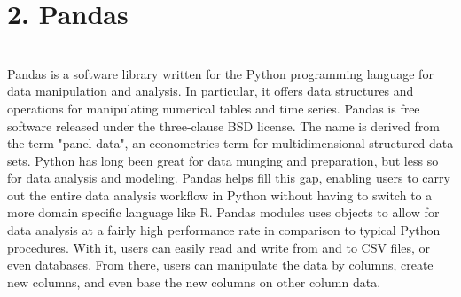 \chapter{\textbf{2. Pandas }}\\
Pandas is a software library written for the Python programming language for data manipulation and analysis. In particular, it offers data structures and operations for manipulating numerical tables and time series. Pandas is free software released under the three-clause BSD license. The name is derived from the term "panel data", an econometrics term for multidimensional structured data sets. Python has long been great for data munging and preparation, but less so for data analysis and modeling. Pandas helps fill this gap, enabling users to carry out the entire data analysis workflow in Python without having to switch to a more domain specific language like R. Pandas modules uses objects to allow for data analysis at a fairly high performance rate in 
comparison to typical Python procedures. With it, users can easily read and write from and to CSV files, or even databases. From there, users can manipulate the data by columns, create new columns, and even base the new columns on other column data.

